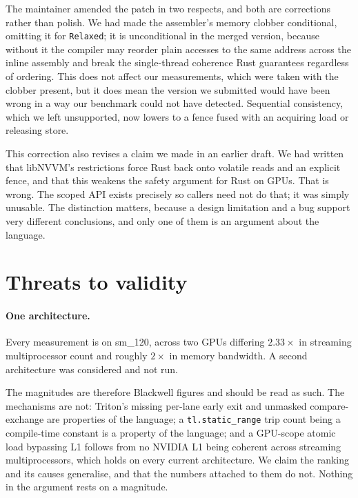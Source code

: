 \documentclass[11pt]{article}
\begin{document}
The maintainer amended the patch in two respects, and both are corrections
rather than polish. We had made the assembler's memory clobber conditional,
omitting it for \texttt{Relaxed}; it is unconditional in the merged version,
because without it the compiler may reorder plain accesses to the same address
across the inline assembly and break the single-thread coherence Rust
guarantees regardless of ordering. This does not affect our measurements, which
were taken with the clobber present, but it does mean the version we submitted
would have been wrong in a way our benchmark could not have detected. Sequential
consistency, which we left unsupported, now lowers to a fence fused with an
acquiring load or releasing store.

This correction also revises a claim we made in an earlier draft. We had written
that libNVVM's restrictions force Rust back onto volatile reads and an explicit
fence, and that this weakens the safety argument for Rust on GPUs. That is wrong.
The scoped API exists precisely so callers need not do that; it was simply
unusable. The distinction matters, because a design limitation and a bug support
very different conclusions, and only one of them is an argument about the
language.

\section{Threats to validity}
\label{sec:threats}

\paragraph{One architecture.} Every measurement is on sm\_120, across two GPUs
differing $2.33\times$ in streaming multiprocessor count and roughly $2\times$ in
memory bandwidth. A second architecture was considered and not run.

The magnitudes are therefore Blackwell figures and should be read as such. The
mechanisms are not: Triton's missing per-lane early exit and unmasked
compare-exchange are properties of the language; a \texttt{tl.static\_range}
trip count being a compile-time constant is a property of the language; and a
GPU-scope atomic load bypassing L1 follows from no NVIDIA L1 being coherent
across streaming multiprocessors, which holds on every current architecture. We
claim the ranking and its causes generalise, and that the numbers attached to
them do not. Nothing in the argument rests on a magnitude.
\end{document}

